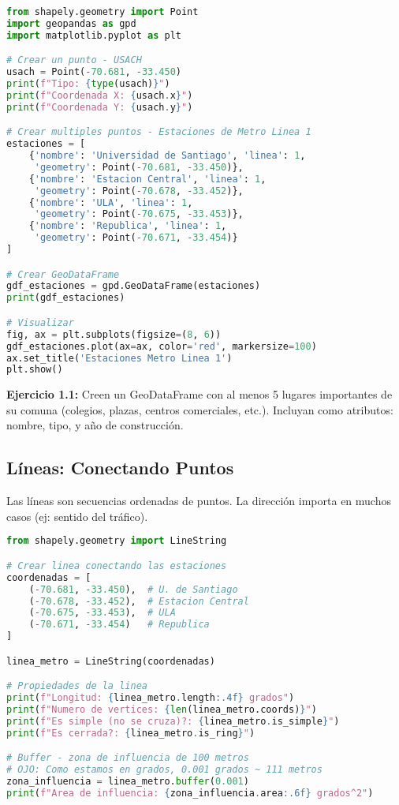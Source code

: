 \documentclass[11pt,a4paper]{article}
\newcommand{\ejercicio}[1]{\begin{tcolorbox}[colback=red!5,colframe=red,title={Ejercicio}]#1\end{tcolorbox}}
\begin{document}
\begin{lstlisting}[language=Python]
from shapely.geometry import Point
import geopandas as gpd
import matplotlib.pyplot as plt

# Crear un punto - USACH
usach = Point(-70.681, -33.450)
print(f"Tipo: {type(usach)}")
print(f"Coordenada X: {usach.x}")
print(f"Coordenada Y: {usach.y}")

# Crear multiples puntos - Estaciones de Metro Linea 1
estaciones = [
    {'nombre': 'Universidad de Santiago', 'linea': 1, 
     'geometry': Point(-70.681, -33.450)},
    {'nombre': 'Estacion Central', 'linea': 1,
     'geometry': Point(-70.678, -33.452)},
    {'nombre': 'ULA', 'linea': 1,
     'geometry': Point(-70.675, -33.453)},
    {'nombre': 'Republica', 'linea': 1,
     'geometry': Point(-70.671, -33.454)}
]

# Crear GeoDataFrame
gdf_estaciones = gpd.GeoDataFrame(estaciones)
print(gdf_estaciones)

# Visualizar
fig, ax = plt.subplots(figsize=(8, 6))
gdf_estaciones.plot(ax=ax, color='red', markersize=100)
ax.set_title('Estaciones Metro Linea 1')
plt.show()
\end{lstlisting}

\ejercicio{
\textbf{Ejercicio 1.1:} Creen un GeoDataFrame con al menos 5 lugares importantes de su comuna (colegios, plazas, centros comerciales, etc.). Incluyan como atributos: nombre, tipo, y año de construcción.
}

\subsection{Líneas: Conectando Puntos}

Las líneas son secuencias ordenadas de puntos. La dirección importa en muchos casos (ej: sentido del tráfico).

\begin{lstlisting}[language=Python]
from shapely.geometry import LineString

# Crear linea conectando las estaciones
coordenadas = [
    (-70.681, -33.450),  # U. de Santiago
    (-70.678, -33.452),  # Estacion Central
    (-70.675, -33.453),  # ULA
    (-70.671, -33.454)   # Republica
]

linea_metro = LineString(coordenadas)

# Propiedades de la linea
print(f"Longitud: {linea_metro.length:.4f} grados")
print(f"Numero de vertices: {len(linea_metro.coords)}")
print(f"Es simple (no se cruza)?: {linea_metro.is_simple}")
print(f"Es cerrada?: {linea_metro.is_ring}")

# Buffer - zona de influencia de 100 metros
# OJO: Como estamos en grados, 0.001 grados ~ 111 metros
zona_influencia = linea_metro.buffer(0.001)
print(f"Area de influencia: {zona_influencia.area:.6f} grados^2")
\end{lstlisting}
\end{document}

